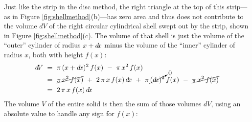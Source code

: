 Just like the strip in the disc method, the right triangle at the top of
this strip---as in Figure \ref{fig:shellmethod}(b)---has zero area and thus does
not contribute to the volume $d\!V$ of the right circular cylindrical shell
swept out by the strip, shown in Figure \ref{fig:shellmethod}(c). The volume of
that shell is just the volume of the ``outer'' cylinder of radius $x+d\!x$ minus
the volume of the ``inner'' cylinder of radius $x$, both with height $f(x)$:
\begin{align*}
d\!V ~&=~ \pi\,(x+d\!x)^2\,f(x) ~-~ \pi\,x^2\,f(x)\\[-6pt]
&=~ \cancel{\pi\,x^2\,f(x)} ~+~ 2\,\pi\,x\,f(x)\,d\!x ~+~
    \pi\,\cancelto{0}{(d\!x)^2}\,f(x) ~-~ \cancel{\pi\,x^2\,f(x)}\\
&=~ 2\,\pi\,x\,f(x)\,d\!x
\end{align*}
The volume $V$ of the entire solid is then the sum of those volumes $d\!V$,
using an absolute value to handle any sign for $f(x)$:


